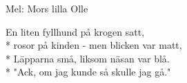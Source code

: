 \begin{SongText}
    \begin{SongInfo}
        Mel: Mors lilla Olle
    \end{SongInfo}
    \begin{SongVerse}
        En liten fyllhund på krogen satt,\\*%
        rosor på kinden - men blicken var matt,\\*%
        Läpparna små, liksom näsan var blå.\\*%
        "Ack, om jag kunde så skulle jag gå."
    \end{SongVerse}
\end{SongText}
